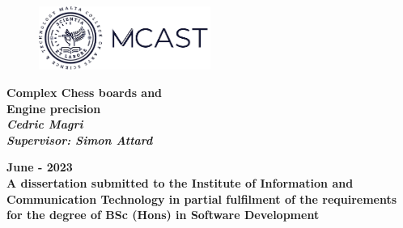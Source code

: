 \begin{titlepage}

\begin{figure}[h!]
\centering
\includegraphics[width=0.5\textwidth, right]{Figures/logo.png}
\caption*{}
\label{fig:entropy} 
\end{figure}

\vspace{0.5in}

\centering
\Huge{\textbf{Complex Chess boards and\\Engine precision}}\\[2.0in]

\large{\textit{\textbf{Cedric Magri}}} \\[0.2in]
\large{\textit{\textbf{Supervisor: Simon Attard}}} \\[0.8in]

\vspace{1.5in}

\normalsize{\textbf{June - 2023}}\\[0.2in]

\normalsize{\textbf{A dissertation submitted to the Institute of Information and Communication Technology in partial fulfilment of
the requirements for the degree of BSc (Hons) in Software Development}}\\[0.2in]


\end{titlepage}
\newpage